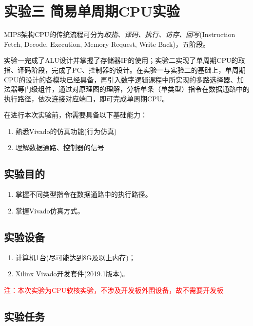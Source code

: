 \section{实验三 \quad 简易单周期CPU实验}
MIPS架构CPU的传统流程可分为\textit{取指、译码、执行、访存、回写}(Instruction Fetch, Decode, Execution, Memory Request, Write Back)，五阶段。

实验一完成了ALU设计并掌握了存储器IP的使用；实验二实现了单周期CPU的取指、译码阶段，完成了PC、控制器的设计。在实验一与实验二的基础上，单周期CPU的设计的各模块已经具备，再引入数字逻辑课程中所实现的多路选择器、加法器等门级组件，通过对原理图的理解，分析单条（单类型）指令在数据通路中的执行路径，依次连接对应端口，即可完成单周期CPU。

在进行本次实验前，你需要具备以下基础能力：
\begin{enumerate}
    \item 熟悉Vivado的仿真功能(行为仿真)
    \item 理解数据通路、控制器的信号
\end{enumerate}

\subsection{实验目的}
\begin{enumerate}
    \item 掌握不同类型指令在数据通路中的执行路径。
    \item 掌握Vivado仿真方式。
\end{enumerate}
\subsection{实验设备}
\begin{enumerate}
    \item 计算机1台(尽可能达到8G及以上内存)；
    \item Xilinx Vivado开发套件(2019.1版本)。
\end{enumerate}
\textcolor{red}{注：本次实验为CPU软核实验，不涉及开发板外围设备，故不需要开发板
}
\subsection{实验任务}
